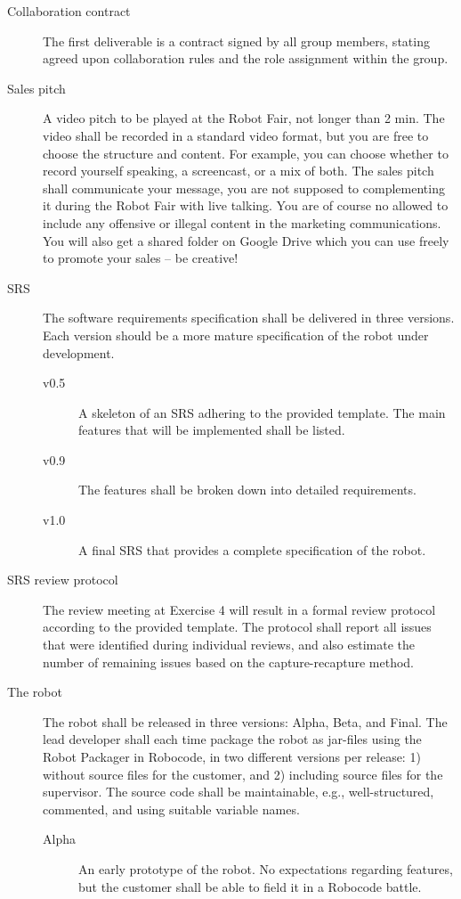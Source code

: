 \documentclass{scrreprt}
\begin{document}
\begin{description}
\item[Collaboration contract] The first deliverable is a contract signed by all group members, stating agreed upon collaboration rules and the role assignment within the group.
\item[Sales pitch] A video pitch to be played at the Robot Fair, not longer than 2 min. The video shall be recorded in a standard video format, but you are free to choose the structure and content. For example, you can choose whether to record yourself speaking, a screencast, or a mix of both. The sales pitch shall communicate your message, you are not supposed to complementing it during the Robot Fair with live talking. You are of course no allowed to include any offensive or illegal content in the marketing communications. You will also get a shared folder on Google Drive which you can use freely to promote your sales -- be creative!
\item[SRS] The software requirements specification shall be delivered in three versions. Each version should be a more mature specification of the robot under development.
\begin{description}
\item[v0.5] A skeleton of an SRS adhering to the provided template. The main features that will be implemented shall be listed.
\item[v0.9] The features shall be broken down into detailed requirements.
\item[v1.0] A final SRS that provides a complete specification of the robot.
\end{description}
\item[SRS review protocol] The review meeting at Exercise 4 will result in a formal review protocol according to the provided template. The protocol shall report all issues that were identified during individual reviews, and also estimate the number of remaining issues based on the capture-recapture method.
\item[The robot] The robot shall be released in three versions: Alpha, Beta, and Final. The lead developer shall each time package the robot as jar-files using the Robot Packager in Robocode, in two different versions per release: 1) without source files for the customer, and 2) including source files for the supervisor. The source code shall be maintainable, e.g., well-structured, commented, and using suitable variable names.
\begin{description}
\item[Alpha] An early prototype of the robot. No expectations regarding features, but the customer shall be able to field it in a Robocode battle.

\end{description}
\end{description}
\end{document}

